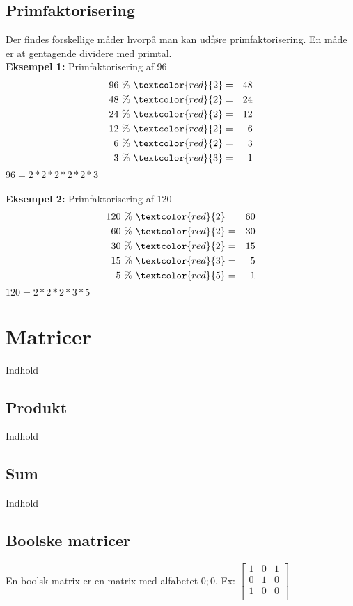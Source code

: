 \documentclass[a4paper]{article}
\begin{document}
  \subsection{Primfaktorisering}
   Der findes forskellige måder hvorpå man kan udføre primfaktorisering. En måde er at gentagende dividere med primtal.\\
   \textbf{Eksempel 1:} Primfaktorisering af 96
   \begin{eqnarray}
    96\ \%\ \textcolor{red}{2} &=& 48 \nonumber\\
    48\ \%\ \textcolor{red}{2} &=& 24 \nonumber\\
    24\ \%\ \textcolor{red}{2} &=& 12 \nonumber\\
    12\ \%\ \textcolor{red}{2} &=& 6 \nonumber\\
    6\ \%\ \textcolor{red}{2} &=& 3 \nonumber\\
    3\ \%\ \textcolor{red}{3} &=& 1 \nonumber
   \end{eqnarray}
   $96 = 2 * 2 * 2 * 2 * 2 * 3$\\\\
   \textbf{Eksempel 2:} Primfaktorisering af 120
   \begin{eqnarray}
    120\ \%\ \textcolor{red}{2} &=& 60 \nonumber\\
    60\ \%\ \textcolor{red}{2} &=& 30 \nonumber\\
    30\ \%\ \textcolor{red}{2} &=& 15 \nonumber\\
    15\ \%\ \textcolor{red}{3} &=& 5 \nonumber\\
    5\ \%\ \textcolor{red}{5} &=& 1 \nonumber
   \end{eqnarray}
   $120 = 2 * 2 * 2 * 3 * 5$
\section{Matricer}
  Indhold
  \subsection{Produkt}
    Indhold
  \subsection{Sum}
    Indhold
  \subsection{Boolske matricer}
    En boolsk matrix er en matrix med alfabetet ${0;0}$. Fx:
    $\left[\begin{smallmatrix}
      1 & 0 & 1 \\
      0 & 1 & 0 \\
      1 & 0 & 0  \\
    \end{smallmatrix}\right]$
\end{document}
